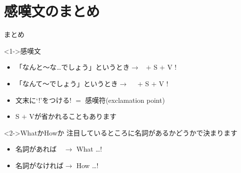 \documentclass[aspectratio=169,xcolor={dvipsnames,table}]{beamer}
\begin{document}
\section{感嘆文のまとめ}
\begin{frame}[plain]{まとめ}

  \begin{block}<1->{感嘆文}
    \begin{itemize}[square]\small
      \item \noindent{}「なんと～な\ldots{}でしょう」というとき$\longrightarrow$\,\,\,%
             $+$ S $+$ V !
      \item \noindent{}「なんて～でしょう」というとき$\longrightarrow$\,\,\,%
            \,\,\,$+$ S $+$ V !
      \item   文末に`!'をつける\hfill{\scriptsize ! $=$ 感嘆符(exclamation point)}
      \item S $+$ Vが省かれることもあります

    \end{itemize}
  \end{block}

  \begin{block}<2->{WhatかHowか}\small
    注目しているところに名詞があるかどうかで決まります
    \begin{itemize}[square]\small
      \item 名詞があれば　$\longrightarrow$ What \ldots !
      \item 名詞がなければ$\longrightarrow$ How \ldots !
    \end{itemize}
  \end{block}
\end{frame}
\end{document}
